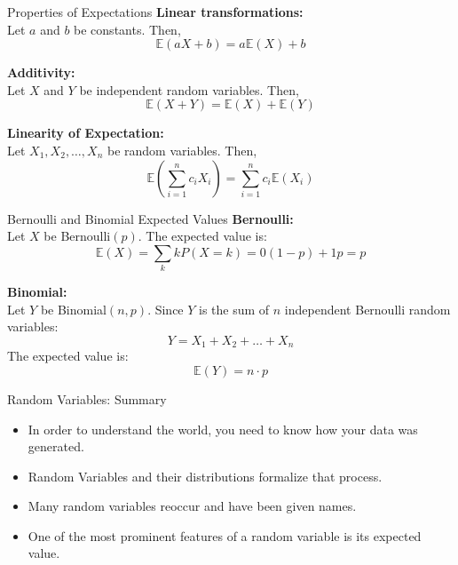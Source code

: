 \documentclass[aspectratio=169]{../latex_main/tntbeamer}  %
\begin{document}
\begin{frame}{Properties of Expectations}
    \textbf{Linear transformations:}\\
    Let $a$ and $b$ be constants. Then,
    \begin{equation}
        \mathbb{E}(aX + b) = a\mathbb{E}(X) + b
    \end{equation}

    \textbf{Additivity:}\\
    Let $X$ and $Y$ be independent random variables. Then,
    \begin{equation}
        \mathbb{E}(X + Y) = \mathbb{E}(X) + \mathbb{E}(Y)
    \end{equation}

    \textbf{Linearity of Expectation:}\\
    Let $X_1, X_2, \dots, X_n$ be random variables. Then,
    \begin{equation}
        \mathbb{E}\left(\sum_{i=1}^{n} c_i X_i\right) = \sum_{i=1}^{n} c_i \mathbb{E}(X_i)
    \end{equation}
\end{frame}

\begin{frame}{Bernoulli and Binomial Expected Values}
    \textbf{Bernoulli:}\\
    Let $X$ be Bernoulli$(p)$. The expected value is:
    \begin{equation}
        \mathbb{E}(X) = \sum_k k P(X=k) = 0(1-p) + 1p = p
    \end{equation}

    \textbf{Binomial:}\\
    Let $Y$ be Binomial$(n, p)$. Since $Y$ is the sum of $n$ independent Bernoulli random variables:
    \begin{equation}
        Y = X_1 + X_2 + \dots + X_n
    \end{equation}
    The expected value is:
    \begin{equation}
        \mathbb{E}(Y) = n \cdot p
    \end{equation}
\end{frame}

\begin{frame}{Random Variables: Summary}
    \begin{itemize}
        \item In order to understand the world, you need to know how your data was generated.
        \item Random Variables and their distributions formalize that process.
        \item Many random variables reoccur and have been given names.
        \item One of the most prominent features of a random variable is its expected value.
    \end{itemize}
\end{frame}


	
\end{document}
